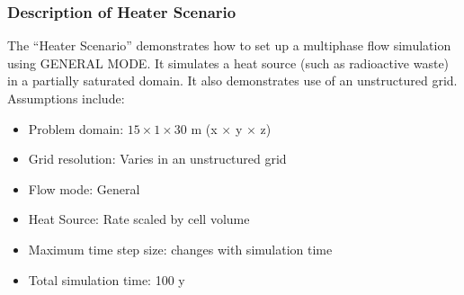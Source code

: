 \documentclass{beamer}
\newcommand\redcomment[1]{{{\color{red} #1}}}
\begin{document}
\begin{frame}\frametitle{Description of Heater Scenario}
The ``Heater Scenario'' demonstrates how to set up a multiphase flow simulation using \redcomment{GENERAL MODE}. It simulates a heat source (such as radioactive waste) in a partially saturated domain. It also demonstrates use of an \redcomment{unstructured grid}. Assumptions include:
\begin{itemize}
  \item Problem domain: $15 \times 1 \times 30$ m (x $\times$ y $\times$ z)
  \item Grid resolution: Varies in an unstructured grid
  \item Flow mode: General
  \item Heat Source: Rate scaled by cell volume
  \item Maximum time step size: changes with simulation time
  \item Total simulation time: 100 y
\end{itemize}

\end{frame}

\end{document}
